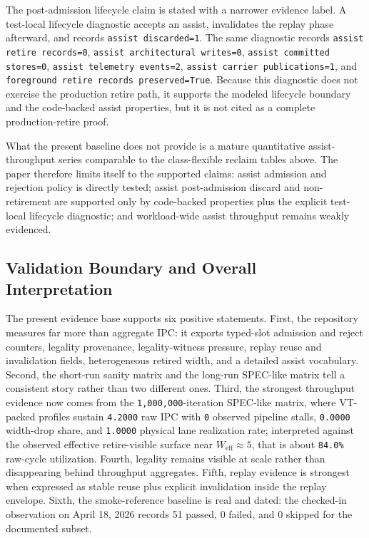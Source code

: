 \documentclass[twocolumn]{article}
\begin{document}
The post-admission lifecycle claim is stated with a narrower evidence label. A test-local lifecycle diagnostic accepts an assist, invalidates the replay phase afterward, and records \texttt{assist discarded=1}. The same diagnostic records \texttt{assist retire records=0}, \texttt{assist architectural writes=0}, \texttt{assist committed stores=0}, \texttt{assist telemetry events=2}, \texttt{assist carrier publications=1}, and \texttt{foreground retire records preserved=True}. Because this diagnostic does not exercise the production retire path, it supports the modeled lifecycle boundary and the code-backed assist properties, but it is not cited as a complete production-retire proof.

What the present baseline does not provide is a mature quantitative assist-throughput series comparable to the class-flexible reclaim tables above. The paper therefore limits itself to the supported claims: assist admission and rejection policy is directly tested; assist post-admission discard and non-retirement are supported only by code-backed properties plus the explicit test-local lifecycle diagnostic; and workload-wide assist throughput remains weakly evidenced.


\subsection{Validation Boundary and Overall Interpretation}

The present evidence base supports six positive statements. First, the repository measures far more than aggregate IPC: it exports typed-slot admission and reject counters, legality provenance, legality-witness pressure, replay reuse and invalidation fields, heterogeneous retired width, and a detailed assist vocabulary. Second, the short-run sanity matrix and the long-run SPEC-like matrix tell a consistent story rather than two different ones. Third, the strongest throughput evidence now comes from the \texttt{1,000,000}-iteration SPEC-like matrix, where VT-packed profiles sustain \texttt{4.2000} raw IPC with \texttt{0} observed pipeline stalls, \texttt{0.0000} width-drop share, and \texttt{1.0000} physical lane realization rate; interpreted against the observed effective retire-visible surface near \(W_{\mathrm{eff}}\approx5\), that is about \texttt{84.0\%} raw-cycle utilization. Fourth, legality remains visible at scale rather than disappearing behind throughput aggregates. Fifth, replay evidence is strongest when expressed as stable reuse plus explicit invalidation inside the replay envelope. Sixth, the smoke-reference baseline is real and dated: the checked-in observation on April 18, 2026 records 51 passed, 0 failed, and 0 skipped for the documented subset.
\end{document}
